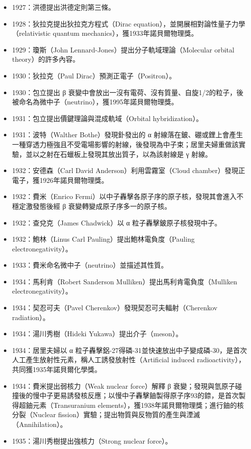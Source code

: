 \documentclass[a4paper,12pt]{article}
\begin{document}
\begin{itemize}
\item 1927：洪德提出洪德定則第三條。
\item 1928：狄拉克提出狄拉克方程式（Dirac equation），並開展相對論性量子力學（relativistic quantum mechanics），獲1933年諾貝爾物理獎。
\item 1929：瓊斯（John Lennard-Jones）提出分子軌域理論（Molecular orbital theory）的許多內容。
\item 1930：狄拉克（Paul Dirac）預測正電子（Positron）。
\item 1930：包立提出 β 衰變中會放出一沒有電荷、沒有質量、自旋1/2的粒子，後被命名為微中子（neutrino），獲1995年諾貝爾物理獎。
\item 1931：包立提出價鍵理論與混成軌域（Orbital hybridization）。
\item 1931：波特（Walther Bothe）發現釙發出的 α 射線落在鈹、硼或鋰上會產生一種穿透力極強且不受電場影響的射線，後發現為中子束；居里夫婦重做該實驗，並以之射在石蠟板上發現其放出質子，以為該射線是 γ 射線。
\item 1932：安德森（Carl David Anderson）利用雲霧室（Cloud chamber）發現正電子，獲1926年諾貝爾物理獎。
\item 1932：費米（Enrico Fermi）以中子轟擊各原子序的原子核，發現其會進入不穩定激發態後經 β 衰變轉變成原子序多一的原子核。
\item 1932：查兌克（James Chadwick）以 α 粒子轟擊鈹原子核發現中子。
\item 1932：鮑林（Linus Carl Pauling）提出鮑林電負度（Pauling electronegativity）。
\item 1933：費米命名微中子（neutrino）並描述其性質。
\item 1934：馬利肯（Robert Sanderson Mulliken）提出馬利肯電負度（Mulliken electronegativity）。
\item 1934：契忍可夫（Pavel Cherenkov）發現契忍可夫輻射（Cherenkov radiation）。
\item 1934：湯川秀樹（Hideki Yukawa）提出介子（meson）。
\item 1934：居里夫婦以 α 粒子轟擊鋁-27得磷-31並快速放出中子變成磷-30，是首次人工產生放射性元素，稱人工誘發放射性（Artificial induced radioactivity），共同獲1935年諾貝爾化學獎。
\item 1934：費米提出弱核力（Weak nuclear force）解釋 β 衰變；發現與氫原子碰撞後的慢中子更易誘發核反應；以慢中子轟擊鈾製得原子序93的錼，是首次製得超鈾元素（Transuranium elements），獲1938年諾貝爾物理獎；進行鈾的核分裂（Nuclear fission）實驗；提出物質與反物質的產生與湮滅（Annihilation）。
\item 1935：湯川秀樹提出強核力（Strong nuclear force）。

\end{itemize}
\end{document}
